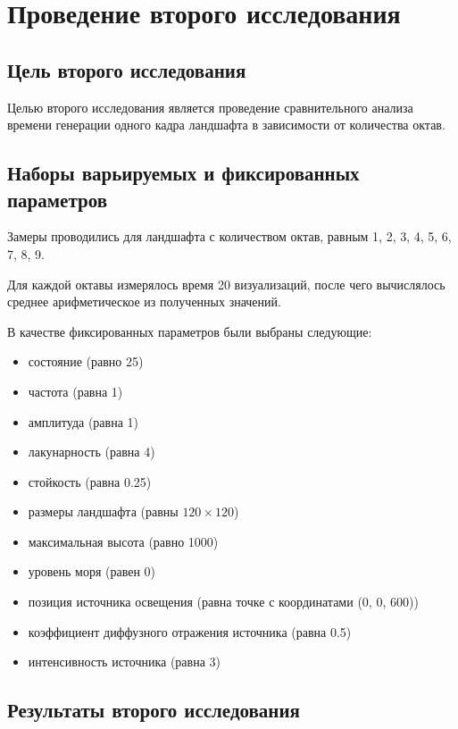 \clearpage

\section{Проведение второго исследования}

\subsection{Цель второго исследования}

Целью второго исследования является проведение сравнительного анализа времени генерации одного кадра ландшафта в зависимости от количества октав. 

\subsection{Наборы варьируемых и фиксированных параметров}

Замеры проводились для ландшафта с количеством октав, равным 1, 2, 3, 4, 5, 6, 7, 8, 9.

Для каждой октавы измерялось время 20 визуализаций, после чего вычислялось среднее арифметическое из полученных значений.

В качестве фиксированных параметров были выбраны следующие:

\begin{itemize}[label=--]
	\item состояние (равно 25)
	\item частота (равна 1)
	\item амплитуда (равна 1)
	\item лакунарность (равна 4)
	\item стойкость (равна 0.25)
	\item размеры ландшафта (равны $120\times120$)
	\item максимальная высота (равно 1000)
	\item уровень моря (равен 0)
	\item позиция источника освещения (равна точке с координатами (0, 0, 600))
	\item коэффициент диффузного отражения источника (равна 0.5)
	\item интенсивность источника (равна 3)
\end{itemize}


\subsection{Результаты второго исследования}

